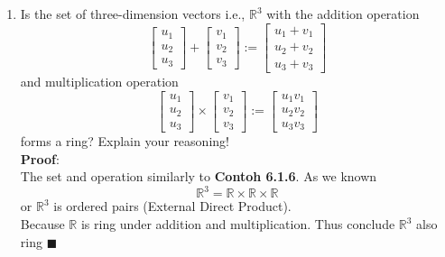 \documentclass{article}
\begin{document}
\begin{enumerate}
        \item Is the set of three-dimension vectors i.e., $\mathbb{R}^3$ with the addition operation
        \[\begin{bmatrix}u_1\\u_2\\u_3\end{bmatrix}+\begin{bmatrix}v_1\\v_2\\v_3\end{bmatrix}:=\begin{bmatrix}u_1+v_1\\u_2+v_2\\u_3+v_3\end{bmatrix}\]
        and multiplication operation
        \[\begin{bmatrix}u_1\\u_2\\u_3\end{bmatrix}\times\begin{bmatrix}v_1\\v_2\\v_3\end{bmatrix}:=\begin{bmatrix}u_1v_1\\u_2v_2\\u_3v_3\end{bmatrix}\]
        forms a ring? Explain your reasoning!\\
        \textbf{Proof}:\\
        The set and operation similarly to \textbf{Contoh 6.1.6}. As we known 
        \[\mathbb{R}^3=\mathbb{R}\times\mathbb{R}\times\mathbb{R}\]
        or $\mathbb{R}^3$ is ordered pairs (External Direct Product).\\
        Because $\mathbb{R}$ is ring under addition and multiplication. Thus conclude $\mathbb{R}^3$ also ring $\blacksquare$
    \end{enumerate}
\end{document}
